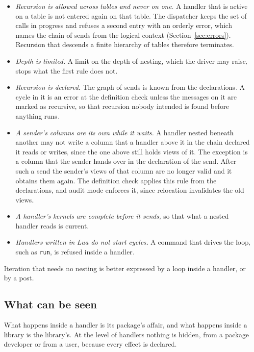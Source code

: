 \documentclass[11pt,a4paper]{article}
\newcommand{\code}[1]{\texttt{#1}}
\begin{document}
\begin{itemize}
  \item \emph{Recursion is allowed across tables and never on one.}  A
        handler that is active on a table is not entered again on that
        table.  The dispatcher keeps the set of calls in progress and
        refuses a second entry with an orderly error, which names the chain
        of sends from the logical context (Section~\ref{sec:errors}).
        Recursion that descends a finite hierarchy of tables therefore
        terminates.
  \item \emph{Depth is limited.}  A limit on the depth of nesting, which the
        driver may raise, stops what the first rule does not.
  \item \emph{Recursion is declared.}  The graph of sends is known from the
        declarations.  A cycle in it is an error at the definition check
        unless the messages on it are marked as recursive, so that
        recursion nobody intended is found before anything runs.
  \item \emph{A sender's columns are its own while it waits.}  A handler
        nested beneath another may not write a column that a handler above
        it in the chain declared it reads or writes, since the one above
        still holds views of it.  The exception is a column that the sender
        hands over in the declaration of the send.  After such a send the
        sender's views of that column are no longer valid and it obtains
        them again.  The definition check applies this rule from the
        declarations, and audit mode enforces it, since relocation
        invalidates the old views.
  \item \emph{A handler's kernels are complete before it sends,} so that
        what a nested handler reads is current.
  \item \emph{Handlers written in Lua do not start cycles.}  A command that
        drives the loop, such as \code{run}, is refused inside a handler.
\end{itemize}

Iteration that needs no nesting is better expressed by a loop inside a
handler, or by a post.

\subsection{What can be seen}
\label{sec:visibility}

What happens inside a handler is its package's affair, and what happens
inside a library is the library's.  At the level of handlers nothing is
hidden, from a package developer or from a user, because every effect is
declared.
\end{document}
